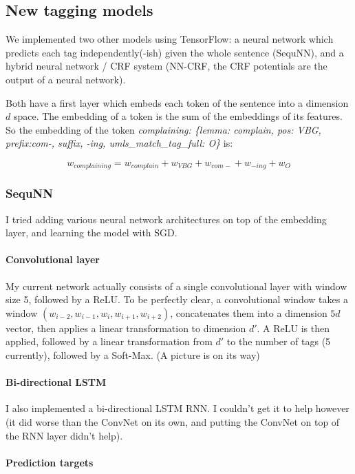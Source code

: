 \documentclass[10pt,a4paper]{article}
\begin{document}
\subsection{New tagging models}

  We implemented two other models using TensorFlow: a neural network which predicts each tag independently(-ish) given the whole sentence (SequNN), and a hybrid neural network / CRF system (NN-CRF, the CRF potentials are the output of a neural network).

  Both have a first layer which embeds each token of the sentence into a dimension $d$ space. The embedding of a token is the sum of the embeddings of its features. So the embedding of the token {\sl{ complaining: \{lemma: complain, pos: VBG, prefix:com-, suffix, -ing, umls\_match\_tag\_full: O\}}} is:
  
  $$w_{complaining} = w_{complain} + w_{VBG} + w_{com-} + w_{-ing} + w_{O}$$

\subsubsection{SequNN}

  I tried adding various neural network architectures on top of the embedding layer, and learning the model with SGD.

  \paragraph{Convolutional layer}
  
  My current network actually consists of a single convolutional layer with window size 5, followed by a ReLU. To be perfectly clear, a convolutional window takes a window $(w_{i-2}, w_{i-1}, w_{i}, w_{i+1}, w_{i+2})$, concatenates them into a dimension $5d$ vector, then applies a linear transformation to dimension $d'$. A ReLU is then applied, followed by a linear transformation from $d'$ to the number of tags (5 currently), followed by a Soft-Max. (A picture is on its way)

  \paragraph{Bi-directional LSTM}

  I also implemented a bi-directional LSTM RNN. I couldn't get it to help however (it did worse than the ConvNet on its own, and putting the ConvNet on top of the RNN layer didn't help).

  \paragraph{Prediction targets}
\end{document}

